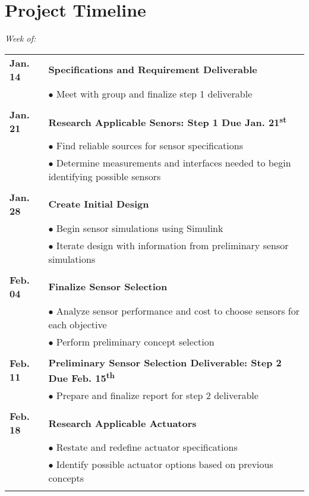 \documentclass[12pt]{article}
\newcommand{\ts}{\textsuperscript}
\begin{document}
\clearpage
\section{Project Timeline}

\begin{flushleft}
\textit{Week of:}

\begin{tabular}{l | l}

\textbf{Jan. 14} & \textbf{Specifications and Requirement Deliverable}\\
 & $\bullet$ Meet with group and finalize step 1 deliverable\\\\
 
\textbf{Jan. 21} & \textbf{Research Applicable Senors: Step 1 Due Jan. 21\ts{st}}\\
 & $\bullet$ Find reliable sources for sensor specifications\\
 & $\bullet$ Determine measurements and interfaces needed to begin identifying possible sensors\\\\
 
 \textbf{Jan. 28} & \textbf{Create Initial Design}\\
 & $\bullet$ Begin sensor simulations using Simulink\\
 & $\bullet$ Iterate design with information from preliminary sensor simulations\\\\
 
\textbf{Feb. 04} & \textbf{Finalize Sensor Selection}\\
 & $\bullet$ Analyze sensor performance and cost to choose sensors for each objective \\
 & $\bullet$ Perform preliminary concept selection\\\\
 
\textbf{Feb. 11} &\textbf{Preliminary Sensor Selection Deliverable: Step 2 Due Feb. 15\ts{th}}\\
 & $\bullet$ Prepare and finalize report for step 2 deliverable\\\\
 
\textbf{Feb. 18} &\textbf{Research Applicable Actuators}\\
 & $\bullet$ Restate and redefine actuator specifications\\
  & $\bullet$ Identify possible actuator options based on previous concepts\\\\
  

\end{tabular}
\end{flushleft}
\end{document}
